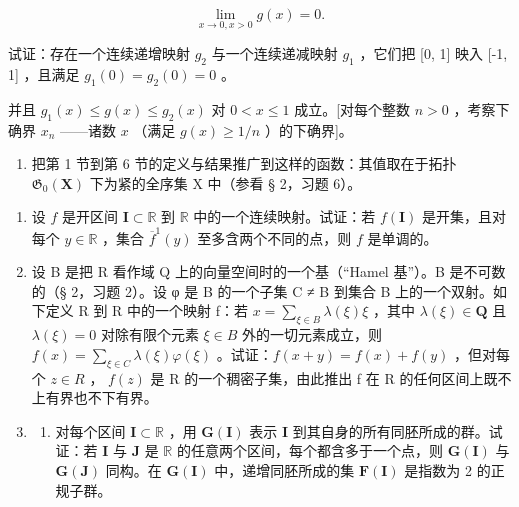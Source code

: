 \[
\lim _ {x \rightarrow 0, x > 0} g (x) = 0.
\]

试证：存在一个连续递增映射 \(g_{2}\) 与一个连续递减映射 \(g_{1}\) ，它们把 {[}0, 1{]} 映入 {[}-1, 1{]} ，且满足 \(g_{1}(0) = g_{2}(0) = 0\) 。

并且 \(g_{1}(x) \leqslant g(x) \leqslant g_{2}(x)\) 对 \(0 < x \leqslant 1\) 成立。{[}对每个整数 \(n > 0\) ，考察下确界 \(x_{n}\) ——诸数 \(x\) （满足 \(g(x) \geqslant 1 / n\) ）的下确界{]}。

\begin{enumerate}
\def\labelenumi{\arabic{enumi})}
\setcounter{enumi}{17}
\tightlist
\item
把第 1 节到第 6 节的定义与结果推广到这样的函数：其值取在于拓扑 \(\mathfrak{G}_{0}(\mathbf{X})\) 下为紧的全序集 X 中（参看 § 2，习题 6）。
\end{enumerate}

\BourbakiExerciseGroup

\begin{enumerate}
\def\labelenumi{\arabic{enumi})}
\item
设 \(f\) 是开区间 \(\mathbf{I} \subset \mathbb{R}\) 到 \(\mathbb{R}\) 中的一个连续映射。试证：若 \(f(\mathbf{I})\) 是开集，且对每个 \(y \in \mathbb{R}\) ，集合 \(\overline{f}^1(y)\) 至多含两个不同的点，则 \(f\) 是单调的。
\item
设 B 是把 R 看作域 Q 上的向量空间时的一个基（``Hamel 基''）。B 是不可数的（§ 2，习题 2）。设 φ 是 B 的一个子集 C ≠ B 到集合 B 上的一个双射。如下定义 R 到 R 中的一个映射 f：若 \(x = \sum_{\xi \in B} \lambda(\xi) \xi\) ，其中 \(\lambda(\xi) \in \mathbf{Q}\) 且 \(\lambda(\xi) = 0\) 对除有限个元素 \(\xi \in B\) 外的一切元素成立，则 \(f(x) = \sum_{\xi \in C} \lambda(\xi) \varphi(\xi)\) 。试证：\(f(x + y) = f(x) + f(y)\) ，但对每个 \(z \in R\) ， \(f(z)\) 是 R 的一个稠密子集，由此推出 f 在 R 的任何区间上既不上有界也不下有界。
\item
  \begin{enumerate}
  \def\labelenumii{\alph{enumii})}
  \tightlist
  \item
对每个区间 \(\mathbf{I} \subset \mathbb{R}\) ，用 \(\mathbf{G}(\mathbf{I})\) 表示 \(\mathbf{I}\) 到其自身的所有同胚所成的群。试证：若 \(\mathbf{I}\) 与 \(\mathbf{J}\) 是 \(\mathbb{R}\) 的任意两个区间，每个都含多于一个点，则 \(\mathbf{G}(\mathbf{I})\) 与 \(\mathbf{G}(\mathbf{J})\) 同构。在 \(\mathbf{G}(\mathbf{I})\) 中，递增同胚所成的集 \(\mathbf{F}(\mathbf{I})\) 是指数为 2 的正规子群。
  \end{enumerate}
\end{enumerate}

